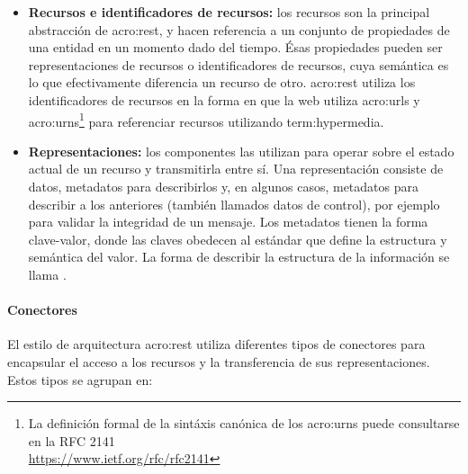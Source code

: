 \begin{itemize}
  \item \textbf{Recursos e identificadores de recursos:} los recursos son la principal abstracción de \gls{acro:rest}, y hacen referencia a un conjunto de propiedades de una entidad en un momento dado del tiempo. Ésas propiedades pueden ser representaciones de recursos o identificadores de recursos, cuya semántica es lo que efectivamente diferencia un recurso de otro. \gls{acro:rest} utiliza los identificadores de recursos en la forma en que la web utiliza \glspl{acro:url} y \glspl{acro:urn}\footnote{La definición formal de la sintáxis canónica de los \glspl{acro:urn} puede consultarse en la RFC 2141\\\url{https://www.ietf.org/rfc/rfc2141}} para referenciar recursos utilizando \gls{term:hypermedia}.

  \item \textbf{Representaciones:} los componentes las utilizan para operar sobre el estado actual de un recurso y transmitirla entre sí. Una representación consiste de datos, metadatos para describirlos y, en algunos casos, metadatos para describir a los anteriores (también llamados datos de control), por ejemplo para validar la integridad de un mensaje. Los metadatos tienen la forma clave-valor, donde las claves obedecen al estándar que define la estructura y semántica del valor. La forma de describir la estructura de la información se llama .
\end{itemize}


\paragraph{Conectores}

El estilo de arquitectura \gls{acro:rest} utiliza diferentes tipos de conectores para encapsular el acceso a los recursos y la transferencia de sus representaciones. Estos tipos se agrupan en:

